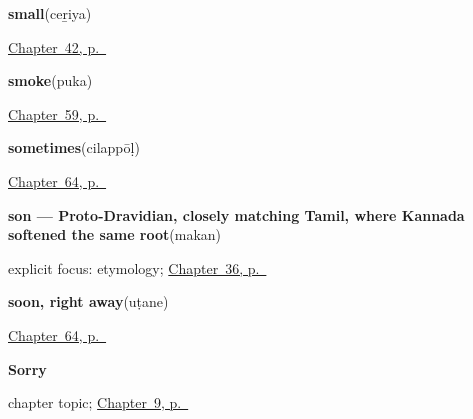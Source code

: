 \noindent\begin{minipage}[t]{\linewidth}
\raggedright
\textbf{small}\enspace\emph{}\enspace(ceṟiya)\par
\footnotesize \hyperref[ch:ml-describing-things]{Chapter~42, p.~\pageref*{ch:ml-describing-things}}
\end{minipage}\par\smallskip

\noindent\begin{minipage}[t]{\linewidth}
\raggedright
\textbf{smoke}\enspace\emph{}\enspace(puka)\par
\footnotesize \hyperref[ch:ml-what-the-air-carries]{Chapter~59, p.~\pageref*{ch:ml-what-the-air-carries}}
\end{minipage}\par\smallskip

\noindent\begin{minipage}[t]{\linewidth}
\raggedright
\textbf{sometimes}\enspace\emph{}\enspace(cilappōḷ)\par
\footnotesize \hyperref[ch:ml-five-words-that-join]{Chapter~64, p.~\pageref*{ch:ml-five-words-that-join}}
\end{minipage}\par\smallskip

\noindent\begin{minipage}[t]{\linewidth}
\raggedright
\textbf{son — Proto-Dravidian, closely matching Tamil, where Kannada softened the same root}\enspace\emph{}\enspace(makan)\par
\footnotesize explicit focus: etymology; \hyperref[ch:ml-child-son-daughter]{Chapter~36, p.~\pageref*{ch:ml-child-son-daughter}}
\end{minipage}\par\smallskip

\noindent\begin{minipage}[t]{\linewidth}
\raggedright
\textbf{soon, right away}\enspace\emph{}\enspace(uṭane)\par
\footnotesize \hyperref[ch:ml-five-words-that-join]{Chapter~64, p.~\pageref*{ch:ml-five-words-that-join}}
\end{minipage}\par\smallskip

\noindent\begin{minipage}[t]{\linewidth}
\raggedright
\textbf{Sorry}\par
\footnotesize chapter topic; \hyperref[ch:ml-sorry]{Chapter~9, p.~\pageref*{ch:ml-sorry}}
\end{minipage}\par\smallskip

